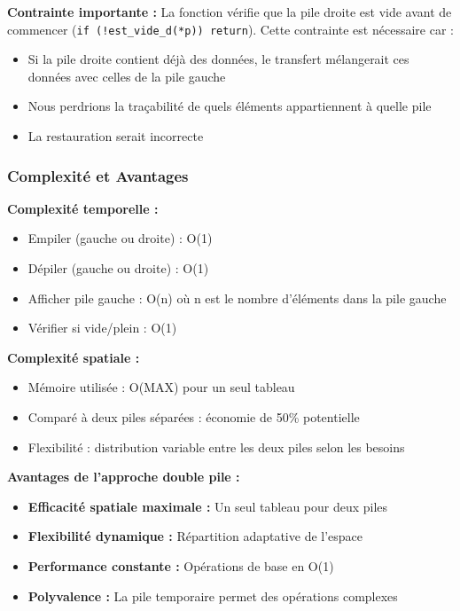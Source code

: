 \documentclass[a4paper, 11pt]{article}
\begin{document}
\textbf{Contrainte importante :}
La fonction vérifie que la pile droite est vide avant de commencer (\texttt{if (!est\_vide\_d(*p)) return}). Cette contrainte est nécessaire car :
\begin{itemize}
    \item Si la pile droite contient déjà des données, le transfert mélangerait ces données avec celles de la pile gauche
    \item Nous perdrions la traçabilité de quels éléments appartiennent à quelle pile
    \item La restauration serait incorrecte
\end{itemize}

\subsubsection*{Complexité et Avantages}

\textbf{Complexité temporelle :}
\begin{itemize}
    \item Empiler (gauche ou droite) : O(1)
    \item Dépiler (gauche ou droite) : O(1)
    \item Afficher pile gauche : O(n) où n est le nombre d'éléments dans la pile gauche
    \item Vérifier si vide/plein : O(1)
\end{itemize}

\textbf{Complexité spatiale :}
\begin{itemize}
    \item Mémoire utilisée : O(MAX) pour un seul tableau
    \item Comparé à deux piles séparées : économie de 50\% potentielle
    \item Flexibilité : distribution variable entre les deux piles selon les besoins
\end{itemize}

\textbf{Avantages de l'approche double pile :}
\begin{itemize}
    \item \textbf{Efficacité spatiale maximale :} Un seul tableau pour deux piles
    \item \textbf{Flexibilité dynamique :} Répartition adaptative de l'espace
    \item \textbf{Performance constante :} Opérations de base en O(1)
    \item \textbf{Polyvalence :} La pile temporaire permet des opérations complexes
\end{itemize}
\end{document}
